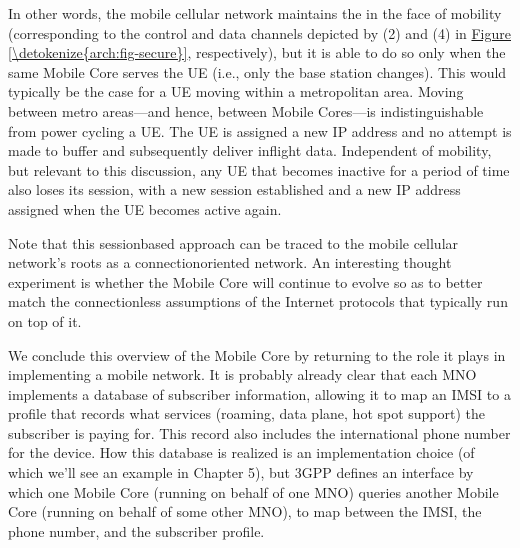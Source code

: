 \documentclass[a4paper,11pt,english]{sphinxmanual}
\begin{document}
\sphinxAtStartPar
In other words, the mobile cellular network maintains the 
in the face of mobility (corresponding to the control and data
channels depicted by (2) and (4) in \hyperref[\detokenize{arch:fig-secure}]{Figure \ref{\detokenize{arch:fig-secure}}},
respectively), but it is able to do so only when the same Mobile Core
serves the UE (i.e., only the base station changes). This would
typically be the case for a UE moving within a metropolitan area.
Moving between metro areas—and hence, between Mobile Cores—is
indistinguishable from power cycling a UE. The UE is assigned a new IP
address and no attempt is made to buffer and subsequently deliver
in\sphinxhyphen{}flight data. Independent of mobility, but relevant to this
discussion, any UE that becomes inactive for a period of time also
loses its session, with a new session established and a new IP address
assigned when the UE becomes active again.

\sphinxAtStartPar
Note that this session\sphinxhyphen{}based approach can be traced to the mobile
cellular network’s roots as a connection\sphinxhyphen{}oriented network. An
interesting thought experiment is whether the Mobile Core will
continue to evolve so as to better match the connectionless
assumptions of the Internet protocols that typically run on top of it.

\sphinxAtStartPar
We conclude this overview of the Mobile Core by returning to the role
it plays in implementing a  mobile network. It is probably
already clear that each MNO implements a database of subscriber
information, allowing it to map an IMSI to a profile that records what
services (roaming, data plane, hot spot support) the subscriber is
paying for. This record also includes the international phone number
for the device. How this database is realized is an implementation
choice (of which we’ll see an example in Chapter 5), but 3GPP defines
an interface by which one Mobile Core (running on behalf of one MNO)
queries another Mobile Core (running on behalf of some other MNO), to
map between the IMSI, the phone number, and the subscriber profile.
\end{document}

